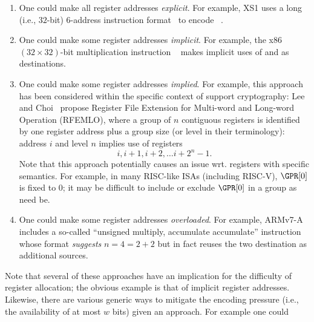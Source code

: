 \begin{description}
      \begin{enumerate}
      \item One could make all  register addresses {\em explicit}.
            For example, XS1 uses a long (i.e., $32$-bit) $6$-address 
            instruction format~\cite[Page 246]{SCARV:XS1:09} 
            to encode
            ~\cite[Page 146]{SCARV:XS1:09}.
      \item One could make some register addresses {\em implicit}.  
            For example, the x86 $( 32 \times 32 )$-bit multiplication 
            instruction 
            ~\cite[Page 4-144--4-145]{SCARV:X86:2:18} 
            makes implicit uses of  and  as destinations.
      \item One could make some register addresses {\em implied}.
            For example, this approach has been considered within the
            specific context of support cryptography: 
            Lee and Choi~\cite{SCARV:LeeCho:08} propose Register File
            Extension for Multi-word and Long-word Operation (RFEMLO), 
            where a group of $n$ contiguous registers is identified by 
            one register address plus a group size (or level in their terminology): 
            address $i$ and level $n$ implies use of registers
            \[
            i, i + 1, i + 2, \ldots i + 2^n - 1 .
            \]
            Note that this approach potentially causes an issue wrt.
            registers with specific semantics.  For example, in many
            RISC-like ISAs (including RISC-V), $\GPR[0]$ is fixed to 
            $0$; it may be difficult to include or exclude $\GPR[0]$ 
            in a group as need be.
      \item One could make some register addresses {\em overloaded}.
            For example, ARMv7-A includes a so-called ``unsigned multiply,
            accumulate accumulate'' instruction 
            ~\cite[Section A8.8.255]{SCARV:ARMv7_M:17} 
            whose format {\em suggests} $n = 4 = 2 + 2$ but in fact 
            reuses the two destination as additional sources.
      \end{enumerate}
      
      \noindent
      Note that several of these approaches have an implication for the
      difficulty of register allocation; the obvious example is that of
      implicit register addresses.  Likewise, there are various generic
      ways to mitigate the encoding pressure (i.e., the availability of 
      at most $w$ bits) given an approach.  For example one could
      

\end{description}

